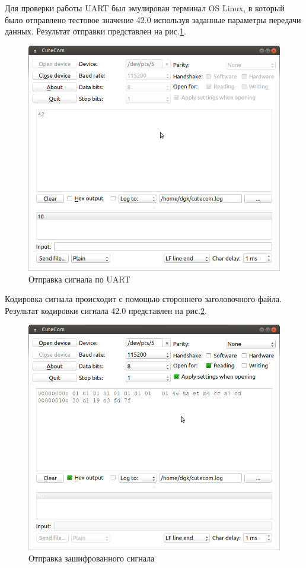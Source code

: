\documentclass[14pt,a4paper]{extreport}
\begin{document}
Для проверки работы UART был эмулирован терминал OS Linux, в который было отправлено тестовое значение 
42.0 используя заданные параметры передачи данных. 
Результат отправки представлен на рис.\ref{fig:uart}.
\begin{figure}[H]
    \centering
    \includegraphics[width=160mm]{img/uart.png}
    \caption{Отправка сигнала по UART}
    \label{fig:uart}
\end{figure}

Кодировка сигнала происходит с помощью стороннего заголовочного файла. 
Результат кодировки сигнала 42.0 представлен на рис.\ref{fig:cobs}.
\begin{figure}[H]
    \centering
    \includegraphics[width=160mm]{img/cobs.png}
    \caption{Отправка зашифрованного сигнала}
    \label{fig:cobs}
\end{figure}
\end{document}
